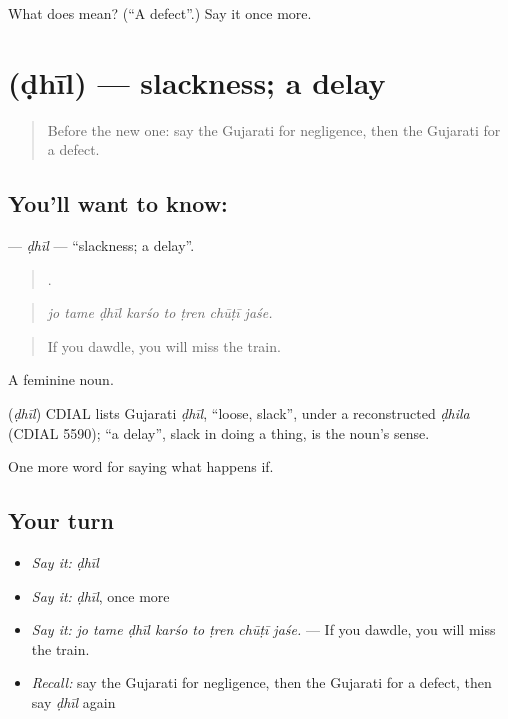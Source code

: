 \begin{tcolorbox}[breakable,colback=teal!4,colframe=teal!35!black,title={Before you move on}]
What does  mean? (\textquotedblleft{}A defect\textquotedblright{}.) Say it once more.
\end{tcolorbox}
\section[\texorpdfstring{\gu{ઢીલ} (ḍhīl)}{ઢીલ (ḍhīl)}]{ (ḍhīl) — slackness; a delay}

\label{lesson:GU-C376-dhil}



\begin{quote}
Before the new one: say the Gujarati for negligence, then the Gujarati for a defect.
\end{quote}

\subsection*{You'll want to know: }
\textbf{} — \emph{ḍhīl} — \textquotedblleft{}slackness; a delay\textquotedblright{}.

\begin{quote}
       .
\end{quote}

\begin{quote}
\emph{jo tame ḍhīl karśo to ṭren chūṭī jaśe.}
\end{quote}

\begin{quote}
If you dawdle, you will miss the train.
\end{quote}

A feminine noun.

\begin{cousinweb}
\textbf{} (\emph{ḍhīl}) CDIAL lists Gujarati \emph{ḍhīl}, \textquotedblleft{}loose, slack\textquotedblright{}, under a reconstructed \emph{ḍhila} (CDIAL 5590); \textquotedblleft{}a delay\textquotedblright{}, slack in doing a thing, is the noun's sense.
\end{cousinweb}

\begin{grammarlens}[title={What you've built}]
One more word for saying what happens if.
\end{grammarlens}

\subsection*{Your turn}
\begin{itemize}
\raggedright
  \item \emph{Say it:} \emph{ḍhīl}
  \item \emph{Say it:} \emph{ḍhīl}, once more
  \item \emph{Say it:} \emph{jo tame ḍhīl karśo to ṭren chūṭī jaśe.} — If you dawdle, you will miss the train.
  \item \emph{Recall:} say the Gujarati for negligence, then the Gujarati for a defect, then say \emph{ḍhīl} again
\end{itemize}

